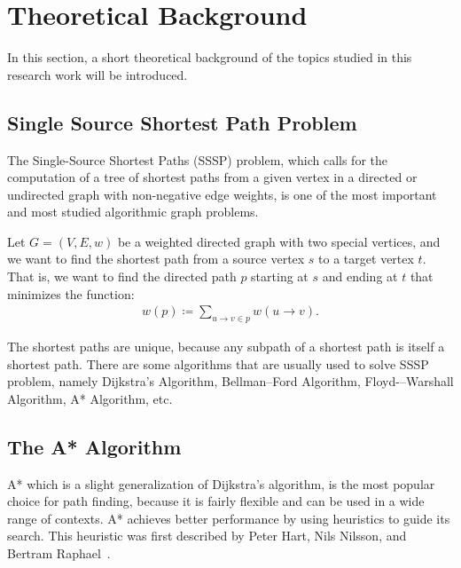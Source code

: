 \section{Theoretical Background}

In this section, a short theoretical background of the topics studied in this research work will be introduced.

\subsection{Single Source Shortest Path Problem}

The Single-Source Shortest Paths (SSSP) problem, which calls for the computation of a tree of shortest paths from a given vertex in a directed or undirected graph with non-negative edge weights, is one of the most important and most studied algorithmic graph problems.

Let $G = (V, E, w)$ be a weighted directed graph with two special vertices, and we want to find the shortest path from a source vertex $s$ to a target vertex $t$. That is, we want to find the directed path $p$ starting at $s$ and ending at $t$ that minimizes the function:
\begin{align}
    w (p) \coloneqq \sum_{u \to v \in p} w(u \to v) .
\end{align}

The shortest paths are unique, because any subpath of a shortest path is itself a shortest path. There are some algorithms that are usually used to solve SSSP problem, namely Dijkstra's Algorithm, Bellman–Ford Algorithm, Floyd-–Warshall Algorithm, A* Algorithm, etc. 

\subsection{The A* Algorithm}\label{sec:astar-pseudo}

A* which is a slight generalization of Dijkstra's algorithm, is the most popular choice for path finding, because it is fairly flexible and can be used in a wide range of contexts. A* achieves better performance by using heuristics to guide its search. This heuristic was first described by Peter Hart, Nils Nilsson, and Bertram Raphael~\cite{Hart1972}.

